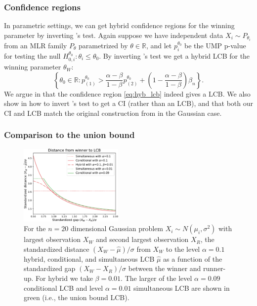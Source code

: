 \documentclass{article}
\newcommand{\R}{\mathbb{R}}
\begin{document}
\subsubsection{Confidence regions}

In parametric settings, we can get hybrid confidence regions for the winning parameter by inverting 's test. Again suppose we have independent data $X_i \sim P_{\theta_i}$ from an MLR family $P_{\theta}$ parametrized by $\theta \in \R$, and let $p_i^{\theta_0}$ be the UMP p-value for testing the null $H^{\theta_0}_{0, i} : \theta_i \leq \theta_0$. By inverting 's test we get a hybrid LCB for the winning parameter $\theta_W$:
\begin{equation}
    \label{eq:hyb_lcb}
    \left\{ \theta_0 \in \R:  p^{\theta_0}_{(1)} > \frac{\alpha-\beta}{1-\beta}p^{\theta_0}_{(2)}  + \left(1 - \frac{\alpha - \beta}{1 - \beta}\right) \beta_n \right\}.
\end{equation}
We argue in  that the confidence region \eqref{eq:hyb_lcb} indeed gives a LCB. We also show in  how to invert 's test to get a CI (rather than an LCB), and that both our CI and LCB match the original construction from \cite{Andrews2023} in the Gaussian case. 

\subsubsection{Comparison to the union bound}

\begin{figure}[]
    \centering
    \includegraphics[width=0.45\textwidth]{hyb_dist_to_winner.pdf}
    \caption{For the $n = 20$ dimensional Gaussian problem $X_i \sim N(\mu_i, \sigma^2)$ with largest observation $X_W$ and second largest observation $X_R$, the standardized distance $(X_W - \hat{\mu})/\sigma$ from $X_W$ to the level $\alpha = 0.1$ hybrid, conditional, and simultaneous LCB $\hat{\mu}$ as a function of the standardized gap $(X_W - X_R)/\sigma$ between the winner and runner-up. For hybrid we take $\beta = 0.01$. The larger of the level $\alpha = 0.09$ conditional LCB and level $\alpha = 0.01$ simultaneous LCB are shown in green (i.e., the union
    bound LCB).}
    \label{fig:hybrid}
\end{figure}
\end{document}
